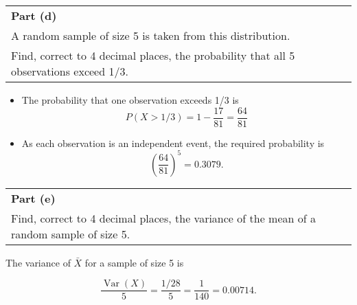 \documentclass[a4paper,30pt]{article}
\begin{document}
\begin{table}[ht!]
     \centering
     \begin{tabular}{|p{15cm}|}
     \hline \large        
\noindent \textbf{Part (d)} \\ \large A random sample of size 5 is taken from this distribution. \\  \large 
Find, correct to 4 decimal places, the probability that all 5 observations exceed 1/3.


\\ \hline
      \end{tabular}
    \end{table}
\large    
\begin{itemize}
\item The probability that one observation exceeds 1/3 is
\[ P(X > 1/3 ) = 1- \frac{17}{81} = \frac{64}{81} \]
\item As each observation is an independent event, the required probability is 
\[  \left( \frac{64}{81} \right)^5 = 0.3079.\]
\end{itemize}





\newpage

    \begin{table}[ht!]
     \centering
     \begin{tabular}{|p{15cm}|}
     \hline \large        
\noindent \textbf{Part (e)} \\ \large Find, correct to 4 decimal places, the variance of the mean of a random sample of size 5.
\\ \hline
      \end{tabular}
    \end{table}
\large
The variance of $\bar{X}$ for a sample of size 5 is 


\[  \frac{\operatorname{Var}(X)}{5}  = \frac{1/28}{5}  = \frac{1}{140} =  0.00714.\]
\end{document}
